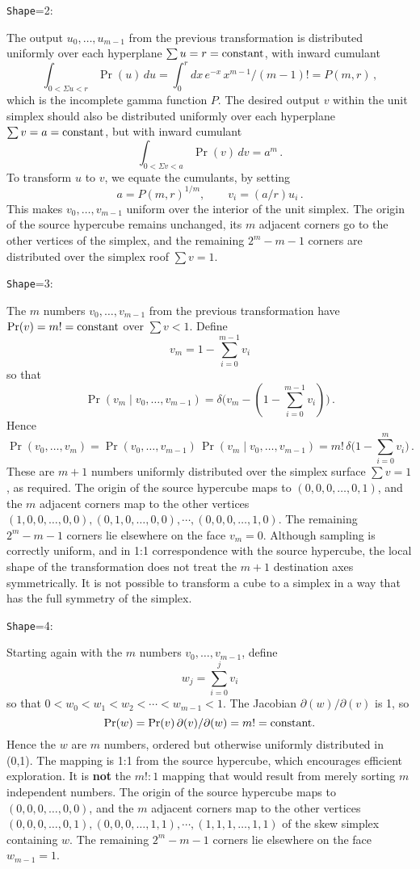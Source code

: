 \bigskip
{\tt Shape}=2:

\noindent The output $u_0,\ldots,u_{m-1}$ from the previous transformation is distributed uniformly over each hyperplane $\sum u = r = {\rm constant}$,
with inward cumulant
$$
    \int_{0 < \Sigma u < r} \Pr(u)\,du = \int_0^r dx\,e^{-x}\,x^{m-1}/(m-1)! = P(m,r)\,,
$$
which is the incomplete gamma function $P$.
The desired output $v$ within the unit simplex should also be distributed uniformly over each hyperplane $\sum v = a = {\rm constant}$,
but with inward cumulant
$$
    \int_{0 < \Sigma v < a} \Pr(v)\,dv = a^m\,.
$$
To transform $u$ to $v$, we equate the cumulants, by setting
$$
    a = P(m,r)^{1/m},\qquad v_i=(a/r)u_i\,.
$$
This makes $v_0,\ldots,v_{m-1}$ uniform over the interior of the unit simplex.
The origin of the source hypercube remains unchanged, its $m$ adjacent corners go to the other vertices of the simplex,
and the remaining $2^m - m - 1$ corners are distributed over the simplex roof $\sum v = 1$.

\bigskip
{\tt Shape}=3:

\noindent The $m$ numbers $v_0,\ldots,v_{m-1}$ from the previous transformation have $\Pr(v) = m! = {\rm constant}$ over $\sum v < 1$.
Define
$$
    v_m = 1 - \sum_{i=0}^{m-1} v_i
$$
so that
$$
    \Pr(v_m \mid v_0,\ldots,v_{m-1}) = \delta\Big(v_m - (1 - \sum_{i=0}^{m-1} v_i)\Big)\,.
$$
Hence
$$
    \Pr(v_0,\ldots,v_m) = \Pr(v_0,\ldots,v_{m-1})\,\Pr(v_m \mid v_0,\ldots,v_{m-1}) = m!\,\delta\Big(1 - \sum_{i=0}^m v_i\Big)\,.
$$
These are $m+1$ numbers uniformly distributed over the simplex surface $\sum v = 1$, as required.
The origin of the source hypercube maps to $(0,0,0,\ldots,0,1)$, 
and the $m$ adjacent corners map to the other vertices $(1,0,0,\ldots,0,0),(0,1,0,\ldots,0,0),\cdots,(0,0,0,\ldots,1,0)$.
The remaining $2^m - m - 1$ corners lie elsewhere on the face $v_m = 0$.
Although sampling is correctly uniform, and in 1:1 correspondence with the source hypercube, 
the local shape of the transformation does not treat the $m+1$ destination axes symmetrically.
It is not possible to transform a cube to a simplex in a way that has the full symmetry of the simplex.

\bigskip
{\tt Shape}=4:
 
\noindent Starting again with the $m$ numbers $v_0,\ldots,v_{m-1}$, define
$$
    w_j = \sum_{i=0}^j v_i
$$
so that $0 < w_0 < w_1 < w_2 < \cdots < w_{m-1} < 1$.
The Jacobian $\partial(w)/\partial(v)$ is 1, so
$$
    \Pr(w) = \Pr(v)\,\partial(v)/\partial(w) = m! = {\rm constant}.
$$
Hence the $w$ are $m$ numbers, ordered but otherwise uniformly distributed in (0,1).
The mapping is 1:1 from the source hypercube, which encourages efficient exploration.
It is {\bf not} the $m!:1$ mapping that would result from merely sorting $m$ independent numbers.
The origin of the source hypercube maps to $(0,0,0,\ldots,0,0)$, 
and the $m$ adjacent corners map to the other vertices $(0,0,0,\ldots,0,1),(0,0,0,\ldots,1,1),\cdots,(1,1,1,\ldots,1,1)$ of the skew simplex containing $w$.
The remaining $2^m - m - 1$ corners lie elsewhere on the face $w_{m-1} = 1$.

